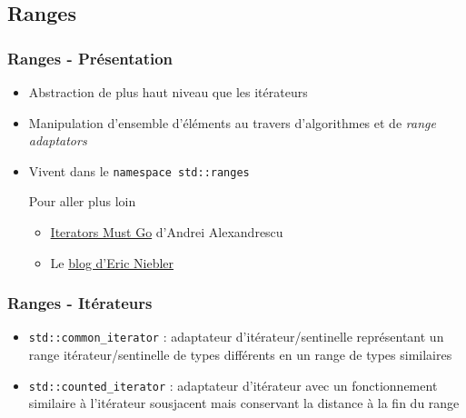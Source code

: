 \documentclass[C++.tex]{subfiles}
\begin{document}
\subsection*{Ranges}
\begin{frame}
	\frametitle{Ranges - Présentation}
	\begin{itemize}
		\item Abstraction de plus haut niveau que les itérateurs
		\item Manipulation d'ensemble d'éléments au travers d'algorithmes et de \textit{range adaptators}
		\item Vivent dans le \lstinline|namespace std::ranges|



		\begin{block}{Pour aller plus loin}
			\begin{itemize}
				\item \href{https://accu.org/content/conf2009/AndreiAlexandrescu_iterators-must-go.pdf}{\og Iterators Must Go\fg{}} d'Andrei Alexandrescu


				\item Le \href{http://ericniebler.com/}{blog d'Eric Niebler}
			\end{itemize}
		\end{block}
	\end{itemize}
\end{frame}

\begin{frame}[fragile]
	\frametitle{Ranges - Itérateurs}
	\begin{itemize}
		\item \lstinline|std::common_iterator| : adaptateur d'itérateur/sentinelle représentant un range itérateur/sentinelle de types différents en un range de types similaires


		\item \lstinline|std::counted_iterator| : adaptateur d'itérateur avec un fonctionnement similaire à l'itérateur sousjacent mais conservant la distance à la fin du range
	\end{itemize}
\end{frame}
\end{document}

